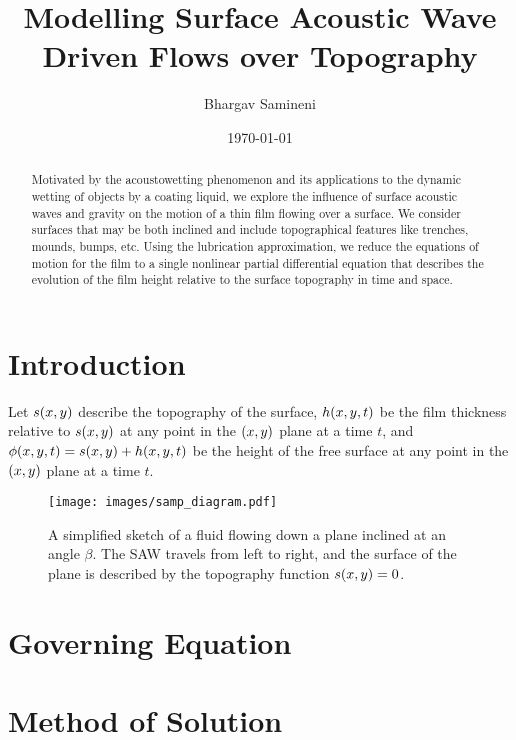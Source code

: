 \documentclass[letterpaper]{article}
\title{Modelling Surface Acoustic Wave Driven Flows over Topography}
\author{Bhargav Samineni}
\date{\today}
\begin{document}
 
\maketitle

\begin{abstract}
    Motivated by the acoustowetting phenomenon and its applications to the dynamic wetting 
    of objects by a coating liquid, we explore the influence of surface acoustic waves and gravity on the motion of a thin film
    flowing over a surface. We consider surfaces that may be both inclined and include topographical features like trenches, mounds, bumps, etc. 
    Using the lubrication approximation, we reduce the equations of motion for the film
    to a single nonlinear partial differential equation that describes the evolution of the film height relative to the 
    surface topography in time and space. 
\end{abstract}
 
 
\section{Introduction}

Let $s\!\left( x, y \right)$ describe the topography of the surface, 
$h\!\left( x,y,t \right)$ be the film thickness relative to $s\!\left( x,y \right)$ at any point in the $\left( x,y \right)$ plane at a time $t$, 
and $\phi\!\left( x,y,t \right) = s\!\left( x,y \right) + h\!\left( x,y,t \right)$ be the height of the free surface at any point in the $\left( x,y \right)$ plane at a time $t$.

\begin{figure}[hb]  
    \centering
    \texttt{[image: images/samp\_diagram.pdf]}
    \caption{A simplified sketch of a fluid flowing down a plane inclined at an angle $\beta$. The SAW travels
    from left to right, and the surface of the plane is described by the topography function $s\!\left( x, y \right) = 0$.}
    \label{fig:diagram}
\end{figure}

\section{Governing Equation} \label{sec:gov_eq}

 
\section{Method of Solution} \label{sec:method_of_sol}

\end{document}
